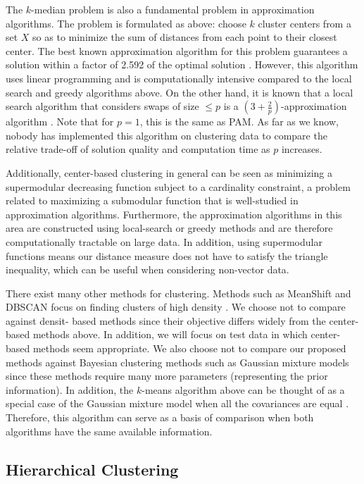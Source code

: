\documentclass{article}
\begin{document}
The $k$-median problem is also a fundamental problem in approximation algorithms. The problem is formulated as above: choose $k$ cluster centers from a set $X$ so as to minimize the sum of distances from each point to their closest center. The best known approximation algorithm for this problem guarantees a solution within a factor of 2.592 of the optimal solution \cite{Wu}. However, this algorithm uses linear programming and is computationally intensive compared to the local search and greedy algorithms above. On the other hand, it is known that a local search algorithm that considers swaps of size $\leq p$ is a $(3 + \frac{2}{p})$-approximation algorithm \cite{Arya}. Note that for $p=1$, this is the same as PAM. As far as we know, nobody has implemented this algorithm on clustering data to compare the relative trade-off of solution quality and computation time as $p$ increases.  

Additionally, center-based clustering in general can be seen as minimizing a supermodular decreasing function subject to a cardinality constraint, a problem related to maximizing a submodular function that is well-studied in approximation algorithms. Furthermore, the approximation algorithms in this area are constructed using local-search or greedy methods and are therefore computationally tractable on large data. In addition, using supermodular functions means our distance measure does not have to satisfy the triangle inequality, which can be useful when considering non-vector data. 

There exist many other methods for clustering. Methods such as MeanShift and DBSCAN focus on finding clusters of high density \cite{Comaniciu, Ester}. We choose not to compare against densit- based methods since their objective differs widely from the center-based methods above. In addition, we will focus on test data in which center-based methods seem appropriate. We also choose not to compare our proposed methods against Bayesian clustering methods such as Gaussian mixture models since these methods require many more parameters (representing the prior information). In addition, the $k$-means algorithm above can be thought of as a special case of the Gaussian mixture model when all the covariances are equal \cite{ESL}. Therefore, this algorithm can serve as a basis of comparison when both algorithms have the same available information. 

\subsection{Hierarchical Clustering}
\end{document}
